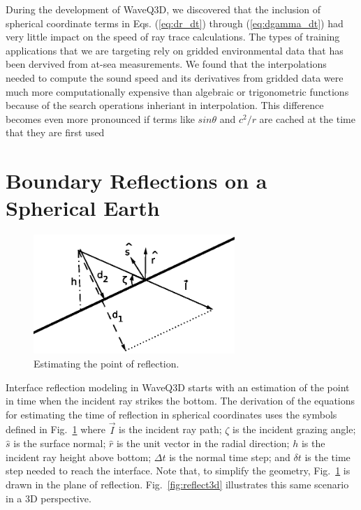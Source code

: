 \documentclass{ws-jca}
\newcommand{\threeD}{3\nobreakdash\textendash D }	%
\begin{document}
During the development of WaveQ3D, we discovered that the inclusion of spherical coordinate terms in Eqs. (\ref{eq:dr_dt}) through (\ref{eq:dgamma_dt}) had very little impact on the speed of ray trace calculations.  The types of training applications that we are targeting rely on gridded environmental data that has been dervived from at-sea measurements.  We found that the interpolations needed to compute the sound speed and its derivatives from gridded data were much more computationally expensive than algebraic or trigonometric functions because of the search operations inheriant in interpolation.  This difference becomes even more pronounced if terms like \(sin\theta\) and $c^2/r$ are cached at the time that they are first used 

\section{Boundary Reflections on a Spherical Earth}

\begin{figure}[th]
	\centerline{\includegraphics[width=3in]{EstPointCollision.eps}} 
	\vspace*{8pt}
	\caption{Estimating the point of reflection. }
	\label{fig:reflection_time}
\end{figure}

Interface reflection modeling in WaveQ3D starts with an estimation of the point in time when the incident ray strikes the bottom.  The derivation of the equations for estimating the time of reflection in spherical coordinates uses the symbols defined in Fig.~\ref{fig:reflection_time} where
\(\vec{I}\) is the incident ray path;
\(\zeta\) is the incident grazing angle;
\(\hat{s}\) is the surface normal;
\(\hat{r}\) is the unit vector in the radial direction;
\(h\) is the incident ray height above bottom;
\(\Delta t\) is the normal time step; and
\(\delta t\) is the time step needed to reach the interface.  
Note that, to simplify the geometry, Fig.~\ref{fig:reflection_time} is drawn in the plane of reflection.   Fig.~\ref{fig:reflect3d} illustrates this same scenario in a \threeD perspective.
\end{document}
